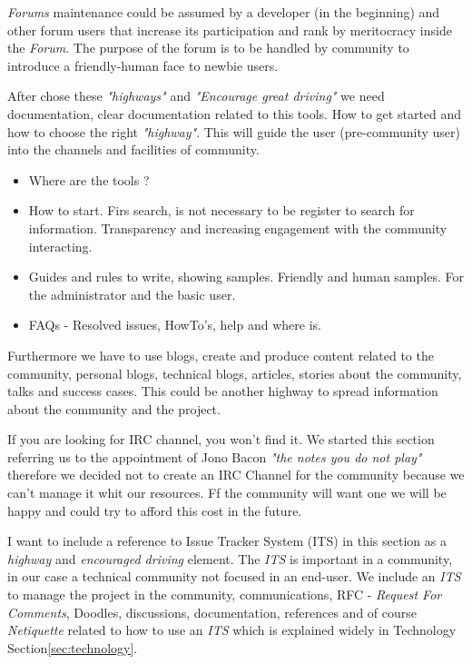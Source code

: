 \documentclass[11pt]{scrartcl}
\begin{document}
\par \emph{Forums} maintenance could be assumed by a developer (in the beginning) and other forum users that increase its participation and rank by meritocracy inside the \emph{Forum}. The purpose of the forum is to be handled by community to introduce a friendly-human face to newbie users.


\par After chose these \emph{"highways"} and \emph{"Encourage great driving"} we need documentation, clear documentation related to this tools. How to get started and how to choose the right \emph{"highway"}. This will guide the user (pre-community user) into the channels and facilities of community. 

\begin{itemize}
	\item Where are the tools ?
	\item How to start. Firs search, is not necessary to be register to search for information. Transparency and increasing engagement with the community interacting.
	\item Guides and rules to write, showing samples. Friendly and human samples. For the administrator and the basic user.
	\item FAQs - Resolved issues, HowTo's, help and where is.
\end{itemize}

\par Furthermore we have to use blogs, create and produce content related to the community, personal blogs, technical blogs, articles, stories about the community, talks and success cases. This could be another highway to spread information about the community and the project.

\par If you are looking for IRC channel, you won't find it. We started this section referring us to the appointment of Jono Bacon \emph{"the notes you do not play"} therefore we decided not to create an IRC Channel for the community because we can't manage it whit our resources. Ff the community will want one we will be happy and could try to afford this cost in the future.

\par I want to include a reference to Issue Tracker System (ITS) in this section as a \emph{highway} and \emph{encouraged driving} element. The \emph{ITS} is important in a community, in our case a technical community not focused in an end-user. We include an \emph{ITS} to manage the project in the community, communications, RFC - \emph{Request For Comments}, Doodles, discussions, documentation, references and of course \emph{Netiquette} related to how to use an \emph{ITS} which is explained widely in Technology Section\ref{sec:technology}.
\end{document}
